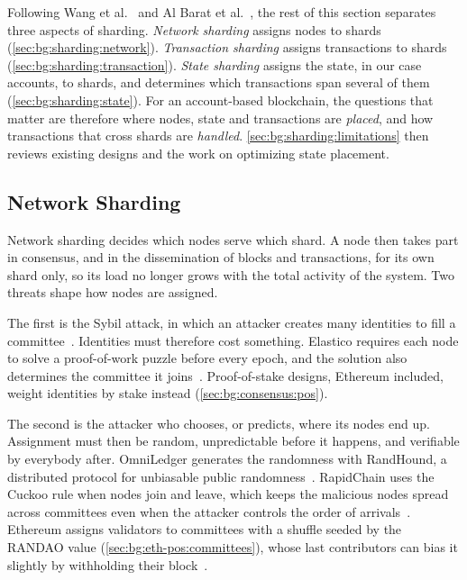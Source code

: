 Following Wang et al.~\cite{wang2019sok} and Al Barat et al.~\cite{al2024sok}, the rest of this section separates three aspects of sharding.
\emph{Network sharding} assigns nodes to shards (\autoref{sec:bg:sharding:network}).
\emph{Transaction sharding} assigns transactions to shards (\autoref{sec:bg:sharding:transaction}).
\emph{State sharding} assigns the state, in our case accounts, to shards, and determines which transactions span several of them (\autoref{sec:bg:sharding:state}).
For an account-based blockchain, the questions that matter are therefore where nodes, state and transactions are \emph{placed}, and how transactions that cross shards are \emph{handled}.
\autoref{sec:bg:sharding:limitations} then reviews existing designs and the work on optimizing state placement.

\subsection{Network Sharding}\label{sec:bg:sharding:network}


Network sharding decides which nodes serve which shard.
A node then takes part in consensus, and in the dissemination of blocks and transactions, for its own shard only, so its load no longer grows with the total activity of the system.
Two threats shape how nodes are assigned.

The first is the Sybil attack, in which an attacker creates many identities to fill a committee~\cite{douceur2002sybil}.
Identities must therefore cost something.
Elastico requires each node to solve a proof-of-work puzzle before every epoch, and the solution also determines the committee it joins~\cite{elastico}.
Proof-of-stake designs, Ethereum included, weight identities by stake instead (\autoref{sec:bg:consensus:pos}).

The second is the attacker who chooses, or predicts, where its nodes end up.
Assignment must then be random, unpredictable before it happens, and verifiable by everybody after.
OmniLedger generates the randomness with RandHound, a distributed protocol for unbiasable public randomness~\cite{omniLedger}.
RapidChain uses the Cuckoo rule when nodes join and leave, which keeps the malicious nodes spread across committees even when the attacker controls the order of arrivals~\cite{rapidchain}.
Ethereum assigns validators to committees with a shuffle seeded by the RANDAO value (\autoref{sec:bg:eth-pos:committees}), whose last contributors can bias it slightly by withholding their block~\cite{nagy2025forking}. 

